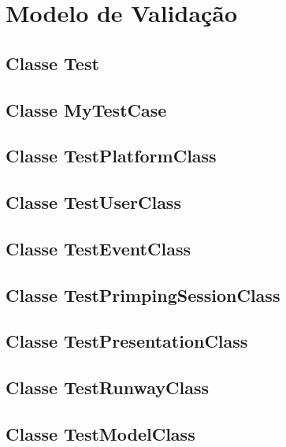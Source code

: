 \documentclass{article}
\begin{document}


\section{Modelo de Validação}
\subsection{Classe Test}


\subsection{Classe MyTestCase}


\subsection{Classe TestPlatformClass}


\subsection{Classe TestUserClass}


\subsection{Classe TestEventClass}


\subsection{Classe TestPrimpingSessionClass}


\subsection{Classe TestPresentationClass}


\subsection{Classe TestRunwayClass}


\subsection{Classe TestModelClass}

\end{document}
